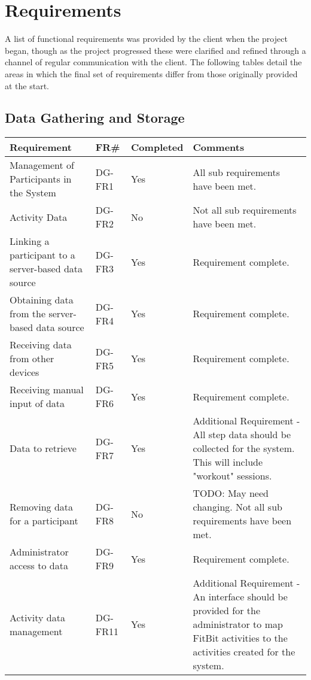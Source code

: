 \chapter{Requirements}

A list of functional requirements was provided by the client when the project began, though as the project progressed these were clarified and refined through a channel of regular communication with the client.  The following tables detail the areas in which the final set of requirements differ from those originally provided at the start.

\section{Data Gathering and Storage}
\begin{tabular}{ |p{5cm}|l|l|p{8cm}|}
\hline
\textbf{Requirement}	&	\textbf{FR\#}	&	\textbf{Completed}	&	\textbf{Comments} \\
\hline
Management of Participants in the System			& DG-FR1	& Yes	& All sub requirements have been met. \\
\hline
Activity Data										& DG-FR2	& No	& Not all sub requirements have been met. \\
\hline
Linking a participant to a server-based data source	& DG-FR3	& Yes	& Requirement complete. \\
\hline
Obtaining data from the server-based data source	& DG-FR4	& Yes	& Requirement complete. \\
\hline
Receiving data from other devices					& DG-FR5	& Yes	& Requirement complete. \\
\hline
Receiving manual input of data						& DG-FR6	& Yes	& Requirement complete. \\
\hline
Data to retrieve 									& DG-FR7	& Yes	& Additional Requirement - All step data should be collected for the system. This will include "workout" sessions. \\
\hline
Removing data for a participant						& DG-FR8	& No	& TODO: May need changing. Not all sub requirements have been met. \\
\hline
Administrator access to data						& DG-FR9	& Yes	& Requirement complete. \\
\hline
Activity data management							& DG-FR11	& Yes	& Additional Requirement - An interface should be provided for the administrator to map FitBit activities to the activities created for the system. \\
\hline
\end{tabular}

